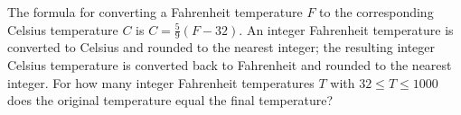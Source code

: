 The formula for converting a Fahrenheit temperature $F$ to the corresponding Celsius temperature $C$ is $C=\frac{5}{9}(F-32)$.  An integer Fahrenheit temperature is converted to Celsius and rounded to the nearest integer; the resulting integer Celsius temperature is converted back to Fahrenheit and rounded to the nearest integer.  For how many integer Fahrenheit temperatures $T$ with $32 \leq T \leq 1000$ does the original temperature equal the final temperature?